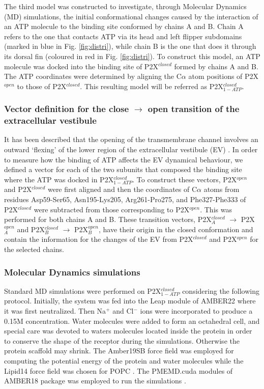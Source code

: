 \documentclass[9pt]{elife}
\begin{document}
	
	The third model was constructed to investigate, through Molecular Dynamics (MD) simulations, the initial conformational changes caused by the interaction of an ATP molecule to the binding site conformed by chains A and B. Chain A refers to the one that contacts ATP via its head and left flipper subdomains (marked in blue in Fig. \ref{fig:distri}), while chain B is the one that does it through its dorsal fin (coloured in red in Fig. \ref{fig:distri}).
	To construct this model, an ATP molecule was docked into the binding site of P2X$^{closed}$ formed by chains A and B. 
	The ATP coordinates were determined by aligning the C$\alpha$ atom positions of P2X$^{open}$ to those of P2X$^{closed}$. This resulting model will be referred as P2X$^{closed}_{1-ATP}$. 
	
	\subsubsection{Vector definition for the close \texorpdfstring{$\longrightarrow$}{->} open transition of the extracellular vestibule}
	
	
	It has been described that the opening of the transmembrane channel involves an outward ‘flexing’ of the lower region of the extracellular vestibule (EV) \cite{abierta_p2x}. In order to measure how the binding of ATP affects the EV dynamical behaviour, we defined a vector for each of the two subunits that composed the binding site where the ATP was docked in P2X$^{closed}_{1-ATP}$. To construct these vectors, P2X$^{open}$ and P2X$^{closed}$ were first aligned and then the
	coordinates of C$\alpha$ atoms from residues Asp59-Ser65, Asn195-Lys205, Arg261-Pro275, and Phe327-Phe333 of P2X$^{closed}$ were subtracted from those corresponding to  P2X$^{open}$. 
	This was performed for both chains A and B. These transition vectors, P2X$^{closed}_A$ $\rightarrow$ P2X$^{open}_A$ and P2X$^{closed}_B$ $\rightarrow$ P2X$^{open}_B$, have their origin in the closed conformation and contain the information for the changes of the EV from P2X$^{closed}$ and P2X$^{open}$ for the selected chains. 
	
	\subsubsection{Molecular Dynamics simulations}
	\label{sec:met_md_simulations}
	
	Standard MD simulations were performed on P2X$^{closed}_{1-ATP}$ considering the following protocol.
	Initially, the system was fed into the Leap module of AMBER22 where it was first neutralized. Then Na$^+$ and Cl$^-$ ions were incorporated to produce a 0.15M concentration. Water molecules were added to form an octahedral cell, and special care was devoted to waters molecules located inside the protein in order to conserve the shape of the receptor during the simulations. 
	Otherwise the protein scaffold may shrink.
	The Amber19SB force field \cite{tian2019ff19sb} was employed for computing the potential energy of the protein and water molecules while the Lipid14 force field was chosen for POPC \cite{lipid14}. 
	The PMEMD.cuda modules of AMBER18 package was employed to run the simulations \cite{amber18}.
	
\end{document}
